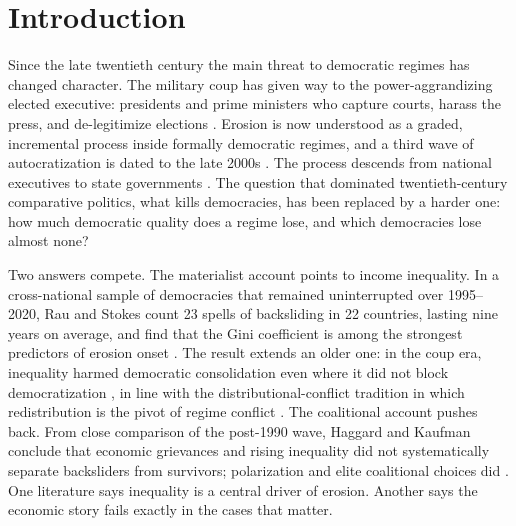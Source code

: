 \documentclass[11pt,letterpaper]{article}
\begin{document}
\section{Introduction}

Since the late twentieth century the main threat to democratic regimes has changed character. The military coup has given way to the power-aggrandizing elected executive: presidents and prime ministers who capture courts, harass the press, and de-legitimize elections \citep{RauStokes2025, WaldnerLust2018, Bermeo2016, LevitskyZiblatt2018}. Erosion is now understood as a graded, incremental process inside formally democratic regimes, and a third wave of autocratization is dated to the late 2000s \citep{LuhrmannLindberg2019}. The process descends from national executives to state governments \citep{Grumbach2023}. The question that dominated twentieth-century comparative politics, what kills democracies, has been replaced by a harder one: how much democratic quality does a regime lose, and which democracies lose almost none?

Two answers compete. The materialist account points to income inequality. In a cross-national sample of democracies that remained uninterrupted over 1995--2020, Rau and Stokes count 23 spells of backsliding in 22 countries, lasting nine years on average, and find that the Gini coefficient is among the strongest predictors of erosion onset \citep{RauStokes2025}. The result extends an older one: in the coup era, inequality harmed democratic consolidation even where it did not block democratization \citep{Houle2009}, in line with the distributional-conflict tradition in which redistribution is the pivot of regime conflict \citep{AcemogluRobinson2006, Boix2003, AnsellSamuels2014}. The coalitional account pushes back. From close comparison of the post-1990 wave, Haggard and Kaufman conclude that economic grievances and rising inequality did not systematically separate backsliders from survivors; polarization and elite coalitional choices did \citep{HaggardKaufman2021, Svolik2019}. One literature says inequality is a central driver of erosion. Another says the economic story fails exactly in the cases that matter.
\end{document}
